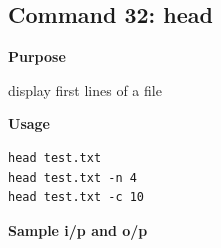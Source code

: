 \subsection{Command 32: head} 
\textbf{Purpose}
\begin{flushleft}
 display first lines of a file
\end{flushleft}
\textbf{Usage}
\begin{verbatim}
head test.txt
head test.txt -n 4
head test.txt -c 10
\end{verbatim}
\textbf{Sample i/p and o/p}
\begin{figure}[H] 
\end{figure}
